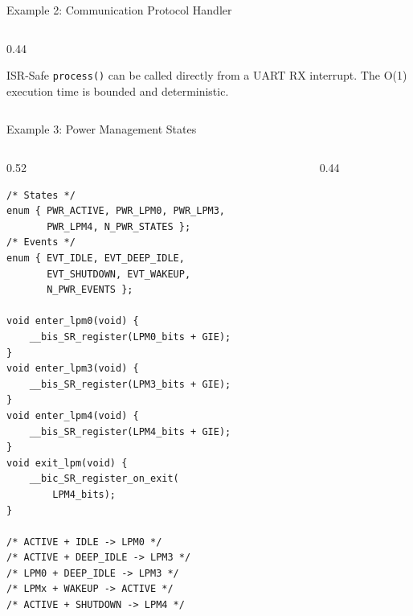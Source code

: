 \documentclass[aspectratio=169, 10pt]{beamer}
\begin{document}
\begin{frame}[fragile]{Example 2: Communication Protocol Handler}
\begin{columns}[T]
\begin{column}{0.44\textwidth}
\vspace{0.3em}
\begin{alertblock}{ISR-Safe}
\texttt{process()} can be called directly from a
UART RX interrupt. The O(1) execution time is
bounded and deterministic.
\end{alertblock}
\end{column}
\end{columns}
\end{frame}

\begin{frame}[fragile]{Example 3: Power Management States}
\begin{columns}[T]
\begin{column}{0.52\textwidth}
\begin{lstlisting}[style=cstyle,
  title={MSP430 power state management}]
/* States */
enum { PWR_ACTIVE, PWR_LPM0, PWR_LPM3,
       PWR_LPM4, N_PWR_STATES };
/* Events */
enum { EVT_IDLE, EVT_DEEP_IDLE,
       EVT_SHUTDOWN, EVT_WAKEUP,
       N_PWR_EVENTS };

void enter_lpm0(void) {
    __bis_SR_register(LPM0_bits + GIE);
}
void enter_lpm3(void) {
    __bis_SR_register(LPM3_bits + GIE);
}
void enter_lpm4(void) {
    __bis_SR_register(LPM4_bits + GIE);
}
void exit_lpm(void) {
    __bic_SR_register_on_exit(
        LPM4_bits);
}

/* ACTIVE + IDLE -> LPM0 */
/* ACTIVE + DEEP_IDLE -> LPM3 */
/* LPM0 + DEEP_IDLE -> LPM3 */
/* LPMx + WAKEUP -> ACTIVE */
/* ACTIVE + SHUTDOWN -> LPM4 */
\end{lstlisting}
\end{column}

\begin{column}{0.44\textwidth}
\begin{center}
\end{center}
\end{column}
\end{columns}
\end{frame}
\end{document}
